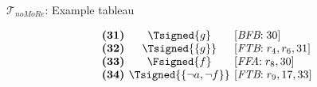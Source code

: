 \begin{frame}{$\mathcal{T}_{\textit{noMoRe}}$: Example tableau}
\begin{center}
\begin{minipage}[t]{16cm}
\begin{minipage}[t]{6cm}
\begin{minipage}[t]{2cm}
\[\begin{array}{l@{~~}c@{~~}l}
\textbf{(31)}                                      &
  \Tsigned{g}                                      &
  [\textit{BFB}{:}\;\text{30}]                     \\
\textbf{(32)}                                      &
  \Tsigned{\{g\}}                                  &
  [\textit{FTB}{:}\;r_4, r_6, \text{31}]           \\
\textbf{(33)}                                      &
  \Fsigned{f}                                      &
  [\textit{FFA}{:}\;r_8, \text{30}]                \\
\textbf{(34)}                                      & \hspace{-0.1cm}
  \Tsigned{\{\neg a,\neg f\}}      \hspace{-0.1cm} &
  [\textit{FTB}{:}\;r_9, \text{17}, \text{33}]
\end{array}
\]
\end{minipage}
\end{minipage}
\end{minipage}
\end{center}
\end{frame}
